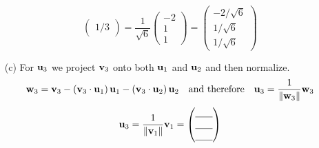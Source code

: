 \begin{problem}
\begin{enumerate}
{\[\begin{pmatrix}
                        1/3\end{pmatrix} = \frac{1}{\sqrt{6}} \begin{pmatrix}
                            -2\\1\\1\end{pmatrix} = \begin{pmatrix} -2/\sqrt{6} \\
                                1/\sqrt{6} \\ 1/\sqrt{6} \end{pmatrix} \]
}
        \item[(c)] For ${\bf u}_3$ we project ${\bf v}_3$ onto both ${\bf u}_1$ and ${\bf u}_2$ and then
            normalize.
            \[ {\bf w}_3 = {\bf v}_3 - \left( {\bf v}_3 \cdot {\bf u}_1 \right){\bf u}_1 - \left( {\bf v}_3 \cdot
                {\bf u}_2
                \right) {\bf u}_2 \quad \text{and therefore} \quad {\bf u}_3 =
                \frac{1}{\|{\bf w}_3\|}{\bf w}_3 \]
            \[ {\bf u}_3 = \frac{1}{\|{\bf v}_1\|} {\bf v}_1 =  \begin{pmatrix}
                    \underline{\hspace{0.25in}} \\ \underline{\hspace{0.25in}} \\
                    \underline{\hspace{0.25in}} \end{pmatrix} \]
\solution{
    \[ \bw_3 = \bv_3 - \left( \frac{1}{\sqrt{3}} \right)\begin{pmatrix} 1/\sqrt{3} \\
            1/\sqrt{3} \\ 1/\sqrt{3} \end{pmatrix} - \left( \frac{1}{\sqrt{6}} \right)
            \begin{pmatrix} -2/\sqrt{6} \\ 1/\sqrt{6} \\ 1/\sqrt{6} \end{pmatrix} =
                \begin{pmatrix}0\\0\\1\end{pmatrix} - \begin{pmatrix}1/3 \\ 1/3 \\ 1/3
                \end{pmatrix} - \begin{pmatrix} -2/6 \\ 1/6 \\ 1/6 \end{pmatrix} =
\]}
\end{enumerate}
\end{problem}
